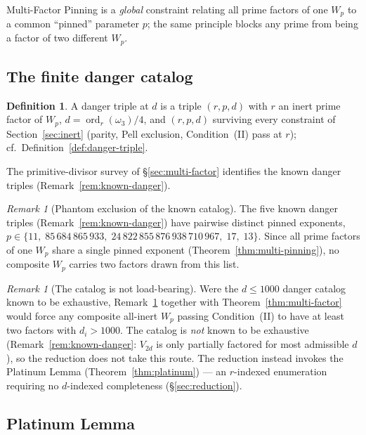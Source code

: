 \documentclass[11pt]{amsart}
\theoremstyle{plain}
\theoremstyle{definition}
\newtheorem{definition}[theorem]{Definition}
\theoremstyle{remark}
\newtheorem{remark}[theorem]{Remark}
\numberwithin{equation}{section}
\newcommand{\ord}{\operatorname{ord}}
\begin{document}
Multi-Factor Pinning is a \emph{global} constraint relating all prime factors of one $W_p$ to a common ``pinned'' parameter $p$; the same principle blocks any prime from being a factor of two different $W_p$.

\subsection{The finite danger catalog}

\begin{definition}\label{def:danger-at-d}
A danger triple at $d$ is a triple $(r, p, d)$ with $r$ an inert prime factor of $W_p$, $d = \ord_r(\omega_3)/4$, and $(r, p, d)$ surviving every constraint of Section~\ref{sec:inert} (parity, Pell exclusion, Condition~(II) pass at $r$); cf.\ Definition~\ref{def:danger-triple}.
\end{definition}

The primitive-divisor survey of \S\ref{sec:multi-factor} identifies the known danger triples (Remark~\ref{rem:known-danger}).

\begin{remark}[Phantom exclusion of the known catalog]\label{rem:phantom-exclusion}
The five known danger triples (Remark~\ref{rem:known-danger}) have pairwise distinct pinned exponents, $p \in \{11,\; 85\,684\,865\,933,\; 24\,822\,855\,876\,938\,710\,967,\; 17,\; 13\}$. Since all prime factors of one $W_p$ share a single pinned exponent (Theorem~\ref{thm:multi-pinning}), no composite $W_p$ carries two factors drawn from this list.
\end{remark}

\begin{remark}[The catalog is not load-bearing]\label{rem:catalog-not-loadbearing}
Were the $d \leq 1000$ danger catalog known to be exhaustive, Remark~\ref{rem:phantom-exclusion} together with Theorem~\ref{thm:multi-factor} would force any composite all-inert $W_p$ passing Condition~(II) to have at least two factors with $d_i > 1000$. The catalog is \emph{not} known to be exhaustive (Remark~\ref{rem:known-danger}: $V_{2d}$ is only partially factored for most admissible $d$), so the reduction does not take this route. The reduction instead invokes the Platinum Lemma (Theorem~\ref{thm:platinum}) --- an $r$-indexed enumeration requiring no $d$-indexed completeness (\S\ref{sec:reduction}).
\end{remark}

\subsection{Platinum Lemma}
\end{document}
